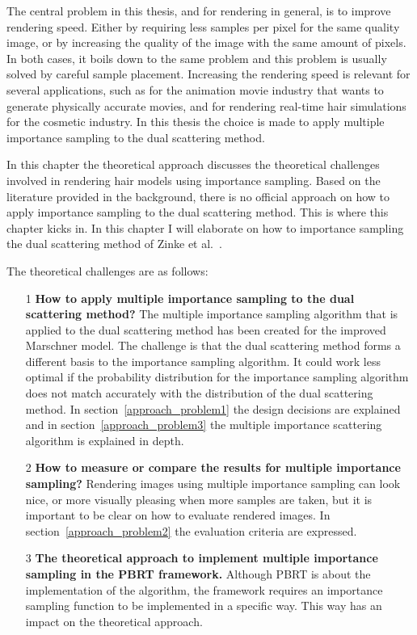 \documentclass[11pt,a4paper]{report}
\begin{document}
The central problem in this thesis, and for rendering in general, is to improve rendering speed. Either by requiring less samples per pixel for the same quality image, or by increasing the quality of the image with the same amount of pixels. In both cases, it boils down to the same problem and this problem is usually solved by careful sample placement. Increasing the rendering speed is relevant for several applications, such as for the animation movie industry that wants to generate physically accurate movies, and for rendering real-time hair simulations for the cosmetic industry. In this thesis the choice is made to apply multiple importance sampling to the dual scattering method.

In this chapter the theoretical approach discusses the theoretical challenges involved in rendering hair models using importance sampling. Based on the literature provided in the background, there is no official approach on how to apply importance sampling to the dual scattering method. This is where this chapter kicks in. In this chapter I will elaborate on how to importance sampling the dual scattering method of Zinke et al.~\cite{zinke}.

The theoretical challenges are as follows:

\begin{itemize}
    \item[1] \textbf{How to apply multiple importance sampling to the dual scattering method?} 
    The multiple importance sampling algorithm that is applied to the dual scattering method has been created for the improved Marschner model. The challenge is that the dual scattering method forms a different basis to the importance sampling algorithm. It could work less optimal if the probability distribution for the importance sampling algorithm does not match accurately with the distribution of the dual scattering method. In section~\ref{approach_problem1} the design decisions are explained and in section~\ref{approach_problem3} the multiple importance scattering algorithm is explained in depth.
    \item[2] \textbf{How to measure or compare the results for multiple importance sampling?} Rendering images using multiple importance sampling can look nice, or more visually pleasing when more samples are taken, but it is important to be clear on how to evaluate rendered images. In section~\ref{approach_problem2} the evaluation criteria are expressed.
    \item[3] \textbf{The theoretical approach to implement multiple importance sampling in the PBRT framework.} Although PBRT is about the implementation of the algorithm, the framework requires an importance sampling function to be implemented in a specific way. This way has an impact on the theoretical approach.
\end{itemize}
\end{document}
